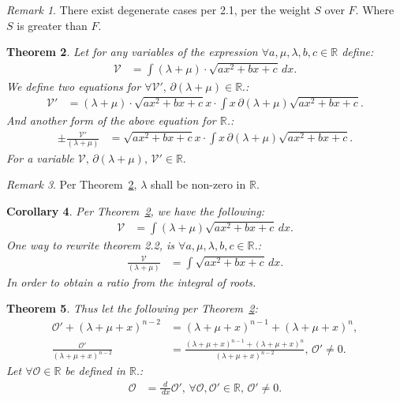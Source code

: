 \documentclass[10pt]{article}
\theoremstyle{plain}
\newtheorem{theorem}{Theorem}[section]
\newtheorem{corollary}[theorem]{Corollary}
\theoremstyle{definition}
\theoremstyle{remark}
\newtheorem{remark}[theorem]{Remark}
\begin{document}
\begin{remark}
	There exist degenerate cases per 2.1, per the weight $S$ over $F$. Where $S$ is greater than $F$.
\end{remark}

\begin{theorem}
\label{theo:expr-int}
	Let for any variables of the expression $\forall a, \mu, \lambda, b, c \in \mathbb{R}$ define:
	\begin{align*}
		\mathcal{V} &= \int (\lambda + \mu) \cdot \sqrt{ax^2 + bx + c} \, dx.
	\end{align*}
	We define two equations for $\forall \mathcal{V}', \, \partial(\lambda + \mu) \in \mathbb{R}.$:
	\begin{align*}
		\mathcal{V}' &= (\lambda + \mu) \cdot  \sqrt{ax^2 + bx + c}x \cdot  \int x \, \partial(\lambda + \mu)\sqrt{ax^2 + bx  +c}.
	\end{align*}
	And another form of the above equation for $\mathbb{R}$.:
	\begin{align*}
		\pm \frac{\mathcal{V}'}{(\lambda + \mu)} &= \sqrt{ax^2 + bx + c}x \cdot  \int x \, \partial(\lambda + \mu)\sqrt{ax^2 + bx  +c}.
	\end{align*}
	For a variable $\mathcal{V}, \, \partial(\lambda + \mu), \, \mathcal{V}' \in \mathbb{R}.$
\end{theorem}

\begin{remark}
	Per Theorem~\ref{theo:expr-int}, $\lambda$ shall be non-zero in $\mathbb{R}.$
\end{remark}

\begin{corollary}
	Per Theorem~\ref{theo:expr-int}, we have the following:
	\begin{align*}
		\mathcal{V} &= \int (\lambda + \mu)\sqrt{ax^2 + bx + c} \, dx.
	\end{align*}
	One way to rewrite theorem 2.2, is $\forall a, \mu, \lambda, b, c \in \mathbb{R}$.:
	\begin{align*}
		\frac{\mathcal{V}}{(\lambda + \mu)} &= \int \sqrt{ax^2 + bx + c} \, dx.
	\end{align*}
	In order to obtain a ratio from the integral of roots.
\end{corollary}

\begin{theorem}
	Thus let the following per Theorem~\ref{theo:expr-int}:
	\begin{align*}
		\mathcal{O}' + (\lambda + \mu + x)^{n-2} &= (\lambda + \mu + x)^{n-1} + (\lambda + \mu + x)^{n},\\
		\frac{\mathcal{O}'}{(\lambda + \mu + x)^{n-2}} &= \frac{(\lambda + \mu + x)^{n-1} + (\lambda + \mu + x)^{n}}{(\lambda + \mu + x)^{n-2}}, \, \mathcal{O}' \neq 0.
	\end{align*}
	Let $\forall \mathcal{O} \in \mathbb{R}$ be defined in $\mathbb{R}.$:
	\begin{align*}
		\mathcal{O} &= \frac{d}{\, dx} \mathcal{O}', \, \forall \mathcal{O}, \mathcal{O}' \in \mathbb{R}, \, \mathcal{O}' \neq 0.
	\end{align*}
\end{theorem}
\end{document}
